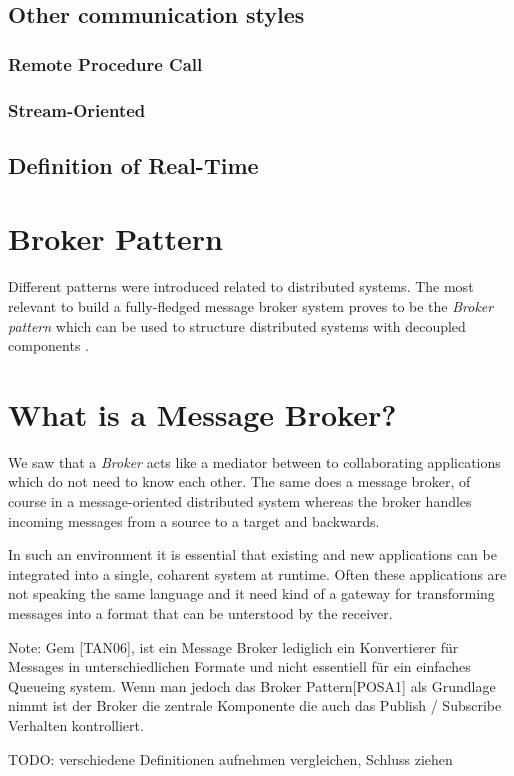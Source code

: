 \subsection{Other communication styles} \subsubsection{Remote Procedure Call}
\subsubsection{Stream-Oriented}

\subsection{Definition of Real-Time}

\section{Broker Pattern} Different patterns were introduced related to
distributed systems. The most relevant to build a fully-fledged message broker
system proves to be the \textit{Broker pattern} which can be used to structure
distributed systems with decoupled components \cite{POSA1}. 

\section{What is a Message Broker?} We saw that a \textit{Broker} acts like a
mediator between to collaborating applications which do not need to know each
other. The same does a message broker, of course in a message-oriented
distributed system whereas the broker handles incoming messages from a source to
a target and backwards. 

In such an environment it is essential that existing and new applications can be
integrated into a single, coharent system at runtime. Often these applications
are not speaking the same language and it need kind of a gateway for
transforming messages into a format that can be unterstood by the receiver.
\cite{TAN06}

Note: Gem [TAN06], ist ein Message Broker lediglich ein Konvertierer für
Messages in unterschiedlichen Formate und nicht essentiell für ein einfaches
Queueing system. Wenn man jedoch das Broker Pattern[POSA1] als Grundlage nimmt
ist der Broker die zentrale Komponente die auch das Publish / Subscribe
Verhalten kontrolliert. 

TODO: verschiedene Definitionen aufnehmen vergleichen, Schluss ziehen \\
